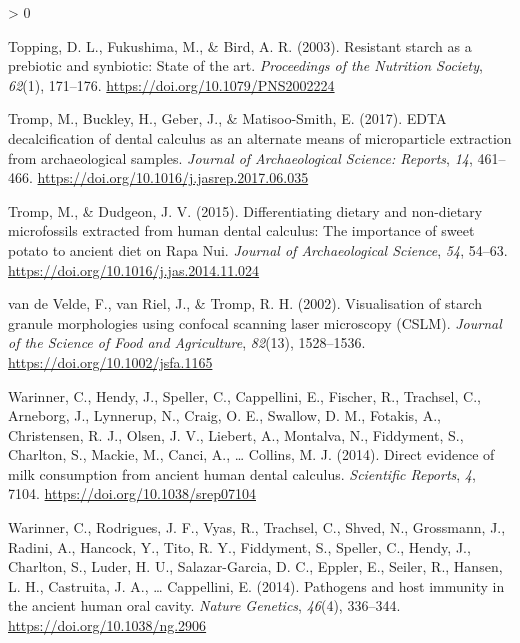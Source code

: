 \documentclass[
]{article}
\newlength{\cslhangindent}
\newenvironment{CSLReferences}[2] %
 {%
  \setlength{\parindent}{0pt}
  \ifodd #1 \everypar{\setlength{\hangindent}{\cslhangindent}}\ignorespaces\fi
  \ifnum #2 > 0
  \setlength{\parskip}{#2\baselineskip}
  \fi
 }%
 {}
\begin{document}
\begin{CSLReferences}{1}{0}
\leavevmode\hypertarget{ref-toppingResistantStarch2003}{}%
Topping, D. L., Fukushima, M., \& Bird, A. R. (2003). Resistant starch as a prebiotic and synbiotic: State of the art. \emph{Proceedings of the Nutrition Society}, \emph{62}(1), 171--176. \url{https://doi.org/10.1079/PNS2002224}

\leavevmode\hypertarget{ref-trompEDTACalculus2017}{}%
Tromp, M., Buckley, H., Geber, J., \& Matisoo-Smith, E. (2017). {EDTA} decalcification of dental calculus as an alternate means of microparticle extraction from archaeological samples. \emph{Journal of Archaeological Science: Reports}, \emph{14}, 461--466. \url{https://doi.org/10.1016/j.jasrep.2017.06.035}

\leavevmode\hypertarget{ref-trompDietaryNondietary2015}{}%
Tromp, M., \& Dudgeon, J. V. (2015). Differentiating dietary and non-dietary microfossils extracted from human dental calculus: The importance of sweet potato to ancient diet on {Rapa Nui}. \emph{Journal of Archaeological Science}, \emph{54}, 54--63. \url{https://doi.org/10.1016/j.jas.2014.11.024}

\leavevmode\hypertarget{ref-vandeveldeStarchMorphology2002}{}%
van de Velde, F., van Riel, J., \& Tromp, R. H. (2002). Visualisation of starch granule morphologies using confocal scanning laser microscopy ({CSLM}). \emph{Journal of the Science of Food and Agriculture}, \emph{82}(13), 1528--1536. \url{https://doi.org/10.1002/jsfa.1165}

\leavevmode\hypertarget{ref-warinnerDirectEvidenceMilk2014}{}%
Warinner, C., Hendy, J., Speller, C., Cappellini, E., Fischer, R., Trachsel, C., Arneborg, J., Lynnerup, N., Craig, O. E., Swallow, D. M., Fotakis, A., Christensen, R. J., Olsen, J. V., Liebert, A., Montalva, N., Fiddyment, S., Charlton, S., Mackie, M., Canci, A., \ldots{} Collins, M. J. (2014). Direct evidence of milk consumption from ancient human dental calculus. \emph{Scientific Reports}, \emph{4}, 7104. \url{https://doi.org/10.1038/srep07104}

\leavevmode\hypertarget{ref-warinnerPathogensHost2014}{}%
Warinner, C., Rodrigues, J. F., Vyas, R., Trachsel, C., Shved, N., Grossmann, J., Radini, A., Hancock, Y., Tito, R. Y., Fiddyment, S., Speller, C., Hendy, J., Charlton, S., Luder, H. U., Salazar-Garcia, D. C., Eppler, E., Seiler, R., Hansen, L. H., Castruita, J. A., \ldots{} Cappellini, E. (2014). Pathogens and host immunity in the ancient human oral cavity. \emph{Nature Genetics}, \emph{46}(4), 336--344. \url{https://doi.org/10.1038/ng.2906}


\end{CSLReferences}
\end{document}
